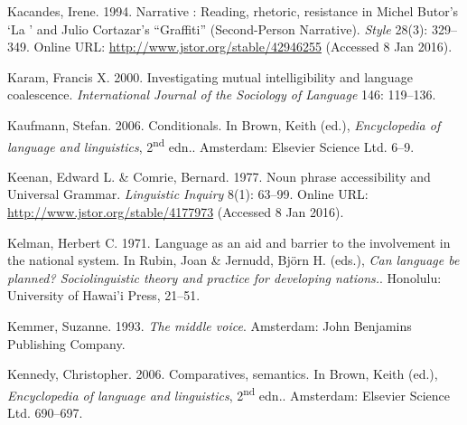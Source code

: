 \begin{styleCitaviBibliographyEntry}
Kacandes, Irene. 1994. Narrative : Reading, rhetoric, resistance in Michel Butor’s ‘La ’ and Julio Cortazar’s “Graffiti” (Second-Person Narrative). \textit{Style} 28(3): 329–349. Online URL: \url{http://www.jstor.org/stable/42946255} (Accessed 8 Jan 2016).
\end{styleCitaviBibliographyEntry}

\begin{styleCitaviBibliographyEntry}
Karam, Francis X. 2000. Investigating mutual intelligibility and language coalescence. \textit{International Journal of the Sociology of Language} 146: 119–136.
\end{styleCitaviBibliographyEntry}

\begin{styleCitaviBibliographyEntry}
Kaufmann, Stefan. 2006. Conditionals. In Brown, Keith (ed.), \textit{Encyclopedia of language and linguistics}, 2\textsuperscript{nd} edn.. Amsterdam: Elsevier Science Ltd. 6–9.
\end{styleCitaviBibliographyEntry}

\begin{styleCitaviBibliographyEntry}
Keenan, Edward L. \& Comrie, Bernard. 1977. Noun phrase accessibility and Universal Grammar. \textit{Linguistic Inquiry} 8(1): 63–99. Online URL: \url{http://www.jstor.org/stable/4177973} (Accessed 8 Jan 2016).
\end{styleCitaviBibliographyEntry}

\begin{styleCitaviBibliographyEntry}
Kelman, Herbert C. 1971. Language as an aid and barrier to the involvement in the national system. In Rubin, Joan \& Jernudd, Björn H. (eds.), \textit{Can language be planned? Sociolinguistic theory and practice for developing nations.}. Honolulu: University of Hawai’i Press, 21–51.
\end{styleCitaviBibliographyEntry}

\begin{styleCitaviBibliographyEntry}
Kemmer, Suzanne. 1993. \textit{The middle voice}. Amsterdam: John Benjamins Publishing Company.
\end{styleCitaviBibliographyEntry}

\begin{styleCitaviBibliographyEntry}
Kennedy, Christopher. 2006. Comparatives, semantics. In Brown, Keith (ed.), \textit{Encyclopedia of language and linguistics}, 2\textsuperscript{nd} edn.. Amsterdam: Elsevier Science Ltd. 690–697.
\end{styleCitaviBibliographyEntry}


